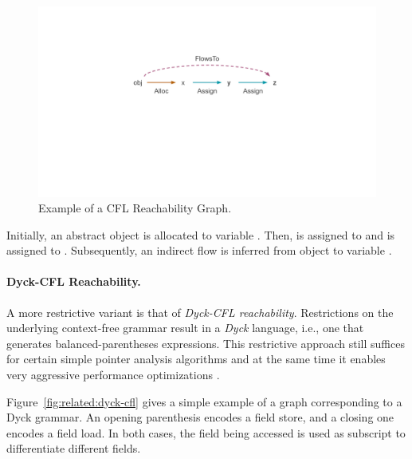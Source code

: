 \begin{figure}[ht]
\centering
\includegraphics[trim={40mm 75mm 40mm 35mm},clip,width=1\linewidth]{assets/related/CFL.pdf}
\caption[Example of a CFL-Reachability Graph]{Example of a CFL Reachability Graph.}
\label{fig:related:cfl}
\end{figure}

Initially, an abstract object  is allocated to variable . Then,  is assigned to  and  is assigned to . Subsequently, an indirect flow is inferred from object  to variable .


\paragraph{Dyck-CFL Reachability.}
A more restrictive variant is that of \emph{Dyck-CFL reachability}. Restrictions on the underlying context-free grammar result in a \emph{Dyck} language, i.e., one that generates balanced-parentheses expressions. This restrictive approach still suffices for certain simple pointer analysis algorithms and at the same time it enables very aggressive performance optimizations \cite{pldi:2013:Zhang,esop:2009:Yuan}.

Figure~\ref{fig:related:dyck-cfl} gives a simple example of a graph corresponding to a Dyck grammar. An opening parenthesis encodes a field store, and a closing one encodes a field load. In both cases, the field being accessed is used as subscript to differentiate different fields.

